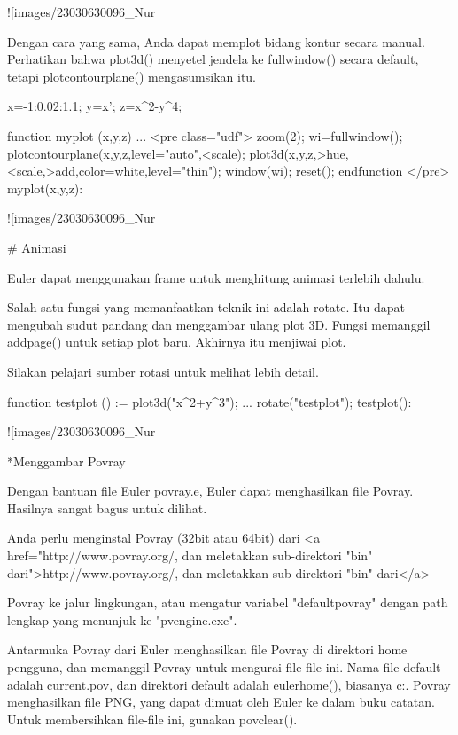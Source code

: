 \documentclass{article}
\begin{document}
![images/23030630096_Nur%

Dengan cara yang sama, Anda dapat memplot bidang kontur secara manual.
Perhatikan bahwa plot3d() menyetel jendela ke fullwindow() secara
default, tetapi plotcontourplane() mengasumsikan itu.


\>x=-1:0.02:1.1; y=x'; z=x^2-y^4;

\>function myplot (x,y,z) ...  
\>  
<pre class="udf">      zoom(2);
      wi=fullwindow();
      plotcontourplane(x,y,z,level="auto",<scale);
      plot3d(x,y,z,>hue,<scale,>add,color=white,level="thin");
      window(wi);
      reset();
    endfunction
</pre>
\>myplot(x,y,z):


![images/23030630096_Nur%

# Animasi

Euler dapat menggunakan frame untuk menghitung animasi terlebih
dahulu.


Salah satu fungsi yang memanfaatkan teknik ini adalah rotate. Itu
dapat mengubah sudut pandang dan menggambar ulang plot 3D. Fungsi
memanggil addpage() untuk setiap plot baru. Akhirnya itu menjiwai
plot.


Silakan pelajari sumber rotasi untuk melihat lebih detail.


\>function testplot () := plot3d("x^2+y^3"); ...  
\>   rotate("testplot"); testplot():


![images/23030630096_Nur%

*Menggambar Povray


Dengan bantuan file Euler povray.e, Euler dapat menghasilkan file
Povray. Hasilnya sangat bagus untuk dilihat.


Anda perlu menginstal Povray (32bit atau 64bit) dari
  <a href="http://www.povray.org/, dan meletakkan sub-direktori "bin" dari">http://www.povray.org/, dan meletakkan sub-direktori "bin" dari</a>


Povray ke jalur lingkungan, atau mengatur variabel "defaultpovray"
dengan path lengkap yang menunjuk ke "pvengine.exe".


Antarmuka Povray dari Euler menghasilkan file Povray di direktori home
pengguna, dan memanggil Povray untuk mengurai file-file ini. Nama file
default adalah current.pov, dan direktori default adalah eulerhome(),
biasanya c:\Users\Username\Euler. Povray menghasilkan file PNG, yang
dapat dimuat oleh Euler ke dalam buku catatan. Untuk membersihkan
file-file ini, gunakan povclear().
\end{document}
